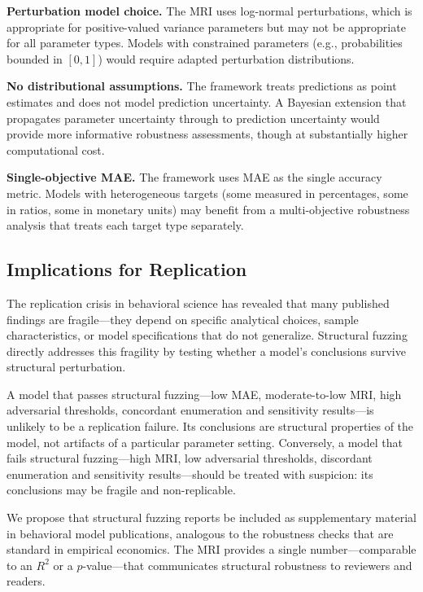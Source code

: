 \documentclass[12pt]{article}
\begin{document}
\textbf{Perturbation model choice.}  The MRI uses log-normal perturbations, which is appropriate for positive-valued variance parameters but may not be appropriate for all parameter types.  Models with constrained parameters (e.g., probabilities bounded in $[0,1]$) would require adapted perturbation distributions.

\textbf{No distributional assumptions.}  The framework treats predictions as point estimates and does not model prediction uncertainty.  A Bayesian extension that propagates parameter uncertainty through to prediction uncertainty would provide more informative robustness assessments, though at substantially higher computational cost.

\textbf{Single-objective MAE.}  The framework uses MAE as the single accuracy metric.  Models with heterogeneous targets (some measured in percentages, some in ratios, some in monetary units) may benefit from a multi-objective robustness analysis that treats each target type separately.

\subsection{Implications for Replication}

The replication crisis in behavioral science \cite{ioannidis2005,open2015} has revealed that many published findings are fragile---they depend on specific analytical choices, sample characteristics, or model specifications that do not generalize.  Structural fuzzing directly addresses this fragility by testing whether a model's conclusions survive structural perturbation.

A model that passes structural fuzzing---low MAE, moderate-to-low MRI, high adversarial thresholds, concordant enumeration and sensitivity results---is unlikely to be a replication failure.  Its conclusions are structural properties of the model, not artifacts of a particular parameter setting.  Conversely, a model that fails structural fuzzing---high MRI, low adversarial thresholds, discordant enumeration and sensitivity results---should be treated with suspicion: its conclusions may be fragile and non-replicable.

We propose that structural fuzzing reports be included as supplementary material in behavioral model publications, analogous to the robustness checks that are standard in empirical economics.  The MRI provides a single number---comparable to an $R^2$ or a $p$-value---that communicates structural robustness to reviewers and readers.
\end{document}
